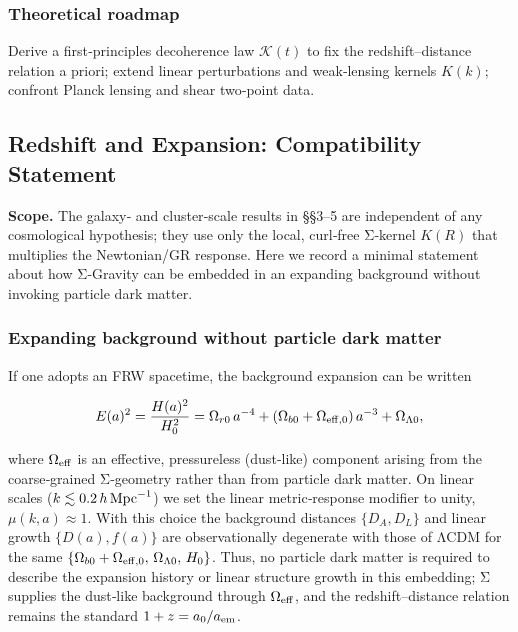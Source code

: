 \documentclass[11pt,a4paper]{article}
\begin{document}
\subsubsection{Theoretical roadmap}


Derive a first‑principles decoherence law $\mathcal{K}(t)$ to fix the redshift–distance relation a priori; extend linear perturbations and weak‑lensing kernels $K(k)$; confront Planck lensing and shear two‑point data.


\subsection{Redshift and Expansion: Compatibility Statement}


\textbf{Scope.} The galaxy‑ and cluster‑scale results in §§3–5 are independent of any cosmological hypothesis; they use only the local, curl‑free Σ‑kernel $K(R)$ that multiplies the Newtonian/GR response. Here we record a minimal statement about how Σ‑Gravity can be embedded in an expanding background without invoking particle dark matter.


\subsubsection{Expanding background without particle dark matter}


If one adopts an FRW spacetime, the background expansion can be written


\begin{equation}
E(a)^2 = \frac{H(a)^2}{H_0^2} = \Omega_{r0}\,a^{-4} + (\Omega_{b0} + \Omega_{\rm eff,0})\,a^{-3} + \Omega_{\Lambda 0},
\end{equation}


where $\Omega_{\rm eff}$ is an effective, pressureless (dust‑like) component arising from the coarse‑grained Σ‑geometry rather than from particle dark matter. On linear scales ($\allowbreak k \lesssim 0.2\,h\,{\rm Mpc}^{-1}$\allowbreak ) we set the linear metric‑response modifier to unity, $\mu(k,a) \approx 1$. With this choice the background distances $\{D_A, D_L\}$ and linear growth $\{D(a), f(a)\}$ are observationally degenerate with those of ΛCDM for the same $\allowbreak \{\Omega_{b0} + \Omega_{\rm eff,0},\, \Omega_{\Lambda 0},\, H_0\}$\allowbreak . Thus, no particle dark matter is required to describe the expansion history or linear structure growth in this embedding; Σ supplies the dust‑like background through $\Omega_{\rm eff}$, and the redshift–distance relation remains the standard $1+z = a_0/a_{\rm em}$.
\end{document}

